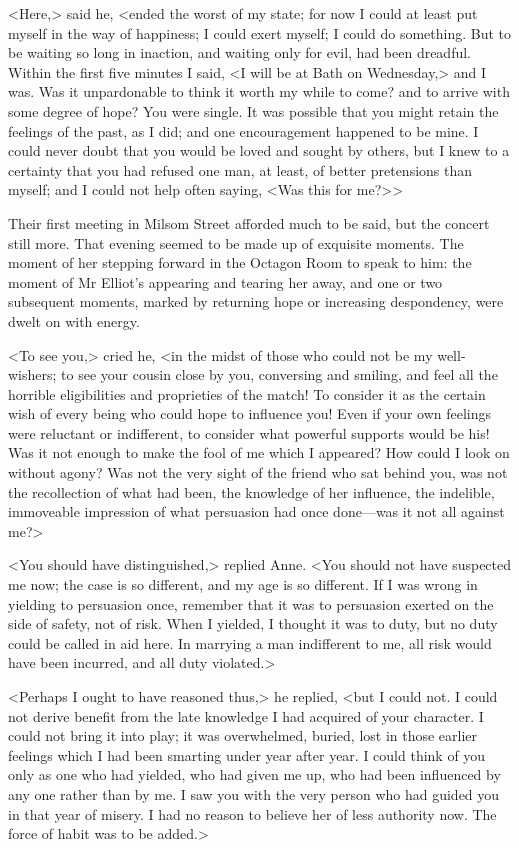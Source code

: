<Here,> said he, <ended the worst of my state; for now I could at least put myself in the way of happiness; I could exert myself; I could do something. But to be waiting so long in inaction, and waiting only for evil, had been dreadful. Within the first five minutes I said, <I will be at Bath on Wednesday,> and I was. Was it unpardonable to think it worth my while to come? and to arrive with some degree of hope? You were single. It was possible that you might retain the feelings of the past, as I did; and one encouragement happened to be mine. I could never doubt that you would be loved and sought by others, but I knew to a certainty that you had refused one man, at least, of better pretensions than myself; and I could not help often saying, <Was this for me?>>

Their first meeting in Milsom Street afforded much to be said, but the concert still more. That evening seemed to be made up of exquisite moments. The moment of her stepping forward in the Octagon Room to speak to him: the moment of Mr Elliot's appearing and tearing her away, and one or two subsequent moments, marked by returning hope or increasing despondency, were dwelt on with energy.

<To see you,> cried he, <in the midst of those who could not be my well-wishers; to see your cousin close by you, conversing and smiling, and feel all the horrible eligibilities and proprieties of the match! To consider it as the certain wish of every being who could hope to influence you! Even if your own feelings were reluctant or indifferent, to consider what powerful supports would be his! Was it not enough to make the fool of me which I appeared? How could I look on without agony? Was not the very sight of the friend who sat behind you, was not the recollection of what had been, the knowledge of her influence, the indelible, immoveable impression of what persuasion had once done—was it not all against me?>

<You should have distinguished,> replied Anne. <You should not have suspected me now; the case is so different, and my age is so different. If I was wrong in yielding to persuasion once, remember that it was to persuasion exerted on the side of safety, not of risk. When I yielded, I thought it was to duty, but no duty could be called in aid here. In marrying a man indifferent to me, all risk would have been incurred, and all duty violated.>

<Perhaps I ought to have reasoned thus,> he replied, <but I could not. I could not derive benefit from the late knowledge I had acquired of your character. I could not bring it into play; it was overwhelmed, buried, lost in those earlier feelings which I had been smarting under year after year. I could think of you only as one who had yielded, who had given me up, who had been influenced by any one rather than by me. I saw you with the very person who had guided you in that year of misery. I had no reason to believe her of less authority now. The force of habit was to be added.>


